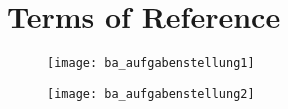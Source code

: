 \section{Terms of Reference} \label{term-reference:1}

\begin{figure}[h!]
	\centering
	\texttt{[image: ba\_aufgabenstellung1]}
\end{figure}

\begin{figure}[h!]
	\centering
	\texttt{[image: ba\_aufgabenstellung2]}
\end{figure}
